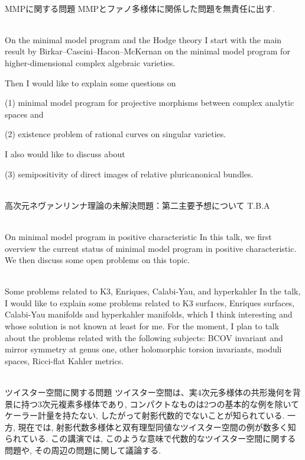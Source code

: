 \documentclass[a4]{jarticle}
\theoremstyle{plain} %
\theoremstyle{definition} %
\begin{document}
\newpage


\vskip5mm

\\
MMPに関する問題
\vskip3mm
MMPとファノ多様体に関係した問題を無責任に出す.
\vskip5mm


\\
On the minimal model program and the Hodge theory
\vskip3mm
I start with the main result by Birkar--Cascini--Hacon--McKernan on the minimal model program for higher-dimensional complex algebraic varieties.
 
Then I would like to explain some questions on 

(1) minimal model program for projective morphisms between complex analytic spaces and 

(2) existence problem of rational curves on singular varieties. 

I also would like to discuss about 

(3) semipositivity of direct images of relative pluricanonical bundles.

\vskip5mm

\\
高次元ネヴァンリンナ理論の未解決問題：第二主要予想について
\vskip3mm
T.B.A
\vskip5mm



\\
On minimal model program in positive characteristic
\vskip3mm
In this talk, we first overview the current status of minimal model 
program in positive characteristic. We then discuss some open problems 
on this topic. 
\vskip5mm

\\
Some problems related to K3, Enriques, Calabi-Yau, and hyperkahler 
\vskip3mm
In the talk, I would like to explain some problems related to K3 surfaces, Enriques surfaces,
Calabi-Yau manifolds and hyperkahler manifolds, which I think interesting and whose solution
is not known at least for me. 
For the moment, I plan to talk about the problems related with 
the following subjects: 
BCOV invariant and mirror symmetry at genus one, other holomorphic torsion invariants, 
moduli spaces, Ricci-flat Kahler metrics.

\vskip5mm


\\
ツイスター空間に関する問題 
\vskip3mm
ツイスター空間は、実4次元多様体の共形幾何を背景に持つ3次元複素多様体であり, コンパクトなものは2つの基本的な例を除いてケーラー計量を持たない, したがって射影代数的でないことが知られている.
一方, 現在では, 射影代数多様体と双有理型同値なツイスター空間の例が数多く知られている. 
この講演では, このような意味で代数的なツイスター空間に関する問題や, 
その周辺の問題に関して議論する. 
\vskip5mm
\end{document}
